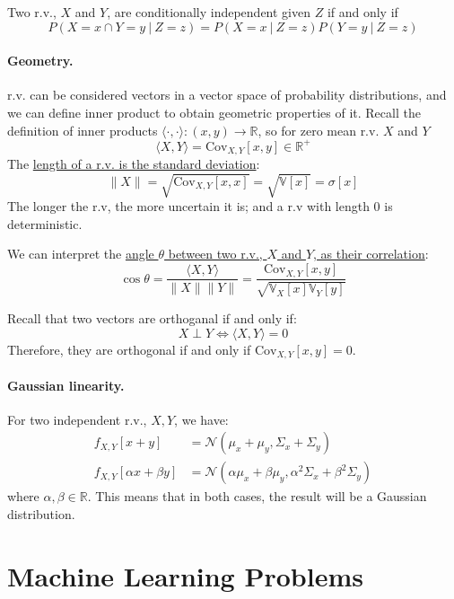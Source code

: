 \documentclass{article}
\begin{document}
\begin{definition}
    Two r.v., $X$ and $Y$, are conditionally independent given $Z$ if and only
    if 
    $$P(X=x\cap Y=y\ |\ Z=z)=P(X=x\ |\ Z=z)P(Y=y\ |\ Z=z)$$
\end{definition}
\paragraph{Geometry.}r.v. can be considered vectors in a vector space of
probability distributions, and we can define inner product to obtain geometric
properties of it. Recall the definition of inner products
$\langle\cdot,\cdot\rangle:(x,y)\to \mathbb{R}$, so for zero mean r.v. $X$ and
$Y$
$$\langle X,Y\rangle=\text{Cov}_{X,Y}[x,y]\in \mathbb{R}^+$$
The \underline{length of a r.v. is the standard deviation}:
$$\lVert X\rVert=\sqrt{\text{Cov}_{X,Y}[x,x]}=\sqrt{\mathbb{V}[x]}=\sigma[x]$$
The longer the r.v, the more uncertain it is; and a r.v with length 0 is
deterministic.

We can interpret the \underline{angle $\theta$ between two r.v., $X$ and $Y$,
as their correlation}:
$$\cos\theta=\frac{\langle X,Y\rangle}{\lVert X\rVert \lVert
Y\rVert}=\frac{\text{Cov}_{X,Y}[x,y]}{\sqrt{\mathbb{V}_X[x]\mathbb{V}_Y[y]}}$$

Recall that two vectors are orthoganal if and only if:
$$X\perp Y\iff\langle X,Y\rangle=0$$
Therefore, they are orthogonal if and only if $\text{Cov}_{X,Y}[x,y]=0$.
\paragraph{Gaussian linearity.}
For two independent r.v., $X,Y$, we have:
$$
\begin{aligned}
    f_{X,Y}[x+y]&=\mathcal{N}(\mu_x+\mu_y,\Sigma_x+\Sigma_y) \\
    f_{X,Y}[\alpha x+\beta y]&=\mathcal{N}(\alpha\mu_x+\beta\mu_y,\alpha^2\Sigma_x+\beta^2\Sigma_y) 
\end{aligned}
$$
where $\alpha,\beta\in \mathbb{R}$. This means that in both cases, the result
will be a Gaussian distribution.
\cleardoublepage
\section{Machine Learning Problems}
\end{document}
